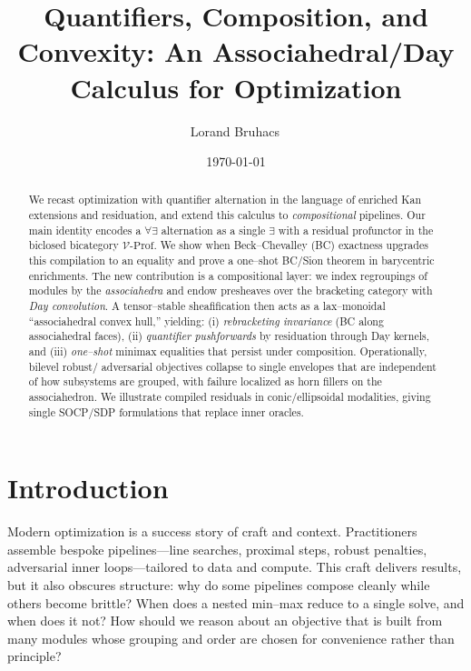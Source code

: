 \documentclass[11pt]{article}
\title{Quantifiers, Composition, and Convexity: An Associahedral/Day Calculus for Optimization}
\author{Lorand Bruhacs\,\orcidlink{0009-0004-6751-0715}}
\date{\today}
\numberwithin{equation}{section}
\theoremstyle{upright}
\newcommand{\V}{\mathcal{V}}
\newcommand{\Prof}{\mathrm{Prof}}
\begin{document}
\maketitle

\begin{abstract}
We recast optimization with quantifier alternation in the language of enriched Kan extensions and residuation, and extend this calculus to \emph{compositional} pipelines. Our main identity encodes a $\forall\exists$ alternation as a single $\exists$ with a residual profunctor in the biclosed bicategory $\V\text{-}\Prof$. We show when Beck--Chevalley (BC) exactness upgrades this compilation to an equality and prove a one–shot BC/Sion theorem in barycentric enrichments. The new contribution is a compositional layer: we index regroupings of modules by the \emph{associahedra} and endow presheaves over the bracketing category with \emph{Day convolution}. A tensor–stable sheafification then acts as a lax–monoidal “associahedral convex hull,” yielding: (i) \emph{rebracketing invariance} (BC along associahedral faces), (ii) \emph{quantifier pushforwards} by residuation through Day kernels, and (iii) \emph{one–shot} minimax equalities that persist under composition. Operationally, bilevel robust/ adversarial objectives collapse to single envelopes that are independent of how subsystems are grouped, with failure localized as horn fillers on the associahedron. We illustrate compiled residuals in conic/ellipsoidal modalities, giving single SOCP/SDP formulations that replace inner oracles.
\end{abstract}

\tableofcontents

\section{Introduction}
\label{sec:intro}

Modern optimization is a success story of craft and context. Practitioners assemble bespoke pipelines—line searches, proximal steps, robust penalties, adversarial inner loops—tailored to data and compute. This craft delivers results, but it also obscures structure: why do some pipelines compose cleanly while others become brittle? When does a nested min--max reduce to a single solve, and when does it not? How should we reason about an objective that is built from many modules whose grouping and order are chosen for convenience rather than principle?
\end{document}
